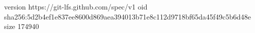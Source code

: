 version https://git-lfs.github.com/spec/v1
oid sha256:5d2b4ef1e837ee8600d869aea394013b71e8c112d9718bf65da45f49c5b6d48e
size 174940
